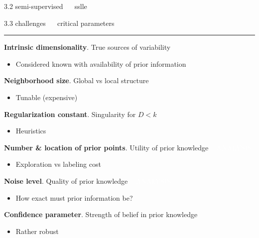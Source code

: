 \documentclass[11pt, compress, t, notes = noshow, xcolor = table, 
aspectratio = 1610]{beamer}
\newcommand{\maketag}[1]{\colorbox{highlightcol}{\textcolor{white}
{\MakeUppercase{#1}}}}
\newcommand{\highlight}[1]{\textcolor{highlightcol}{\textbf{#1}}}
\newcommand{\arritem}{\item[\highlight{$\rightarrow$}]}
\begin{document}
\begin{frame}{\textcolor{gray!90}{3.2 semi-supervised} ~~ sslle}
% 
% 

\end{frame}


\LARGE
\begin{frame}{\textcolor{gray!90}{3.3 challenges} ~~ critical parameters}
\normalsize
\vspace{-0.5cm}
\noindent \textcolor{gray!90}{\rule{\textwidth}{1pt}}
\smallskip

\textbf{Intrinsic dimensionality}. True sources of variability

\begin{itemize}
  \arritem Considered known with availability of prior information
\end{itemize}


\textbf{Neighborhood size}. Global vs local structure

\begin{itemize}
  \arritem Tunable (expensive)
\end{itemize}


\textbf{Regularization constant}. Singularity for $D < k$

\begin{itemize}
  \arritem Heuristics
\end{itemize}


\textbf{Number \& location of prior points}. Utility of prior knowledge ~ 
\maketag{analysis}

\begin{itemize}
  \arritem Exploration vs labeling cost
\end{itemize}

\textbf{Noise level}. Quality of prior knowledge ~ 
\maketag{analysis}

\begin{itemize}
  \arritem How exact must prior information be?
\end{itemize}

\textbf{Confidence parameter}. Strength of belief in prior knowledge 

\begin{itemize}
  \arritem Rather robust
\end{itemize}

\end{frame}
\end{document}
